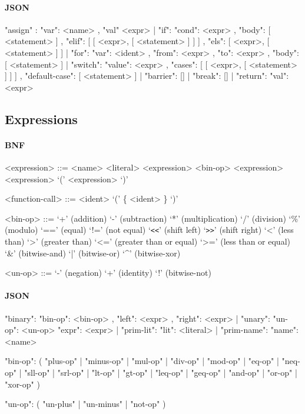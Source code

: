 \documentclass{article}
\begin{document}
\paragraph{JSON}
\begin{jsoncode}
{ "assign" : { "var": <name>
             , "val" <expr>
             }
| "if": { "cond": <expr>
        , "body": [ <statement> ]
        , "elif": [ [ <expr>, [ <statement> ] ] ]
        , "els":  [ <expr>, [ <statement> ] ]
        }
| "for": { "var": <ident>
         , "from": <expr>
         , "to": <expr>
         , "body": [ <statement> ]
         }
| "switch": { "value": <expr>
            , "cases": [ [ <expr>, [ <statement> ] ] ]
            , "default-case": [ <statement> ]
            }
| "barrier": []
| "break": []
| "return": { "val": <expr> }
}

\end{jsoncode}
\subsection{Expressions}
\paragraph{BNF}
\begin{grammar}
  <expression> ::= <name>
  \alt <literal>
  \alt <expression> <bin-op> <expression>
   <expression>
  \alt `(' <expression> `)'

  <function-call> ::= <ident> `(' \{ <ident> \}  `)'

  <bin-op> ::= `+' (addition)
  \alt `-' (subtraction)
  \alt `*' (multiplication)
  \alt `/' (division)
  \alt `\%' (modulo)
  \alt `==' (equal)
  \alt `!=' (not equal)
  \alt `\verb!<<!' (shift left)
  \alt `\verb!>>!' (shift right)
  \alt `<' (less than)
  \alt `>' (greater than)
  \alt `<=' (greater than or equal)
  \alt `>=' (less than or equal)
  \alt `\&' (bitwise-and)
  \alt `|' (bitwise-or)
  \alt `^' (bitwise-xor)

  <un-op> ::= `-' (negation)
  \alt `+' (identity)
  \alt `!' (bitwise-not)

\end{grammar}
\paragraph{JSON}
\begin{jsoncode}
{ "binary": { "bin-op": <bin-op>
            , "left": <expr>
            , "right": <expr>
            }
| "unary": { "un-op": <un-op>
             "expr": <expr>
           }
| "prim-lit": { "lit": <literal> }
| "prim-name": { "name": <name> }
}

{ "bin-op": ( "plus-op"
            | "minus-op"
            | "mul-op"
            | "div-op"
            | "mod-op"
            | "eq-op"
            | "neq-op"
            | "sll-op"
            | "srl-op"
            | "lt-op"
            | "gt-op"
            | "leq-op"
            | "geq-op"
            | "and-op"
            | "or-op"
            | "xor-op"
            )
}

{ "un-op": ( "un-plus"
           | "un-minus"
           | "not-op"
           )
}
\end{jsoncode}
\end{document}
